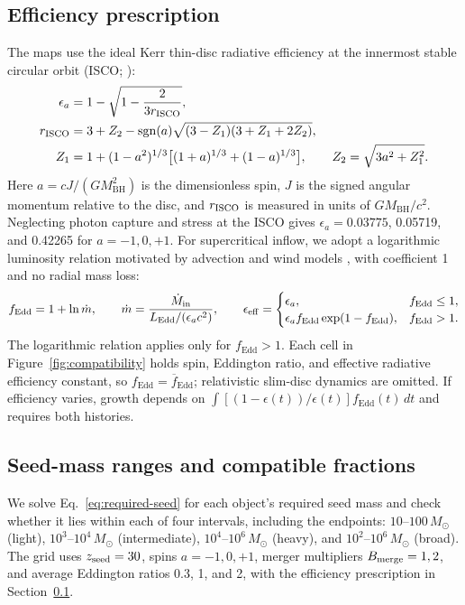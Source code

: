 \documentclass[11pt]{article}
\newcommand{\fedd}{f_{\mathrm{Edd}}}
\newcommand{\mbh}{M_{\mathrm{BH}}}
\begin{document}
\subsection{Efficiency prescription}
\label{app:efficiency}

The maps use the ideal Kerr thin-disc radiative efficiency at the innermost
stable circular orbit (ISCO; \citealt{bardeen1972}):
\begin{align}
\epsilon_a&=1-\sqrt{1-\frac{2}{3r_{\rm ISCO}}},\\
r_{\rm ISCO}&=3+Z_2-\operatorname{sgn}(a)
\sqrt{(3-Z_1)(3+Z_1+2Z_2)},\\
Z_1&=1+(1-a^2)^{1/3}\big[(1+a)^{1/3}+(1-a)^{1/3}\big],\qquad
Z_2=\sqrt{3a^2+Z_1^2}.
\label{eq:spin}
\end{align}
Here $a=cJ/(G\mbh^2)$ is the dimensionless spin, $J$ is the signed angular
momentum relative to the disc, and $r_{\rm ISCO}$ is measured in units of
$G\mbh/c^2$. Neglecting photon capture and stress at the ISCO gives
$\epsilon_a=0.03775$, 0.05719, and 0.42265 for $a=-1,0,+1$.
For supercritical inflow, we adopt a logarithmic luminosity relation motivated
by advection and wind models \citep{poutanen2007}, with coefficient 1 and no
radial mass loss:
\begin{equation}
\fedd=1+\ln\dot m,\qquad
\dot m=\frac{\dot M_{\rm in}}{L_{\rm Edd}/(\epsilon_a c^2)},\qquad
\epsilon_{\rm eff}=\begin{cases}
\epsilon_a,&\fedd\leq1,\\
\epsilon_a\fedd\exp(1-\fedd),&\fedd>1.
\end{cases}
\label{eq:effective-efficiency}
\end{equation}
The logarithmic relation applies only for $\fedd>1$. Each cell in
Figure~\ref{fig:compatibility} holds spin, Eddington ratio, and effective
radiative efficiency constant, so $\fedd=\overline{f}_{\mathrm{Edd}}$;
relativistic slim-disc dynamics are omitted. If efficiency varies, growth
depends on $\int [(1-\epsilon(t))/\epsilon(t)]\fedd(t)\,dt$ and requires
both histories.

\subsection{Seed-mass ranges and compatible fractions}
\label{sec:compatibility}

We solve Eq.~\ref{eq:required-seed} for each object's required seed mass and
check whether it lies within each of four intervals, including the endpoints:
$10$--$100\,M_\odot$ (light), $10^3$--$10^4\,M_\odot$ (intermediate),
$10^4$--$10^6\,M_\odot$ (heavy), and $10^2$--$10^6\,M_\odot$ (broad).
The grid uses $z_{\rm seed}=30$, spins $a=-1,0,+1$, merger multipliers
$B_{\rm merge}=1,2$, and average Eddington ratios 0.3, 1, and 2, with the
efficiency prescription in Section~\ref{app:efficiency}.
\end{document}
